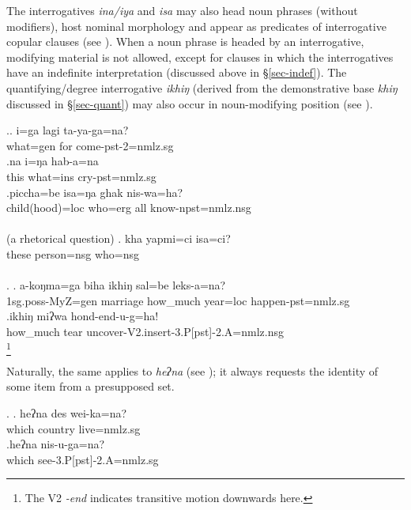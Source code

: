 The interrogatives \emph{ina/iya} and \emph{isa} may also head noun phrases (without modifiers), host nominal morphology and appear as predicates of interrogative copular clauses (see \Next). When a noun phrase is headed by an interrogative, modifying material is not allowed, except for clauses in which the interrogatives have an indefinite interpretation (discussed above in §\ref{sec-indef}).  The quantifying/degree interrogative \emph{ikhiŋ} (derived from the demonstrative base \emph{khiŋ} discussed in §\ref{sec-quant}) may also occur in noun-modifying position (see \NNext).

\ex.\ag. i=ga lagi ta-ya-ga=na?\\
	what{\sc =gen} for come{\sc -pst-2=nmlz.sg}\\
\bg.na   i=ŋa      hab-a=na\\
this what{\sc =ins} cry{\sc [3sg]-pst=nmlz.sg}\\
 
	\bg.piccha=be    isa=ŋa   ghak nis-wa=ha?\\
	child(hood){\sc =loc} who{\sc =erg} all know{\sc [3A;3.P]-npst=nmlz.nsg}\\
	  \\
	(a rhetorical question)
	\bg.	kha yapmi=ci isa=ci?\\
			these  person{\sc =nsg} who{\sc =nsg} \\
			 \\
	
\ex. \ag. a-koŋma=ga      biha     ikhiŋ   sal=be     leks-a=na?\\
{\sc 1sg.poss-}MyZ{\sc =gen}  marriage how\_much year{\sc =loc} happen{\sc [3sg]-pst=nmlz.sg}\\
 
\bg.ikhiŋ   miʔwa hond-end-u-g=ha!\\
how\_much tear uncover{\sc -V2.insert-3.P[pst]-2.A=nmlz.nsg}\\
\footnote{The V2 \emph{-end} indicates transitive motion downwards here.} 

Naturally, the same applies to \emph{heʔna}  (see \Next); it always requests the identity of some item from a presupposed set.

\ex. \ag. heʔna des     wei-ka=na?\\
which country live{=nmlz.sg}\\
 
\bg.heʔna  nis-u-ga=na?\\
which see{\sc -3.P[pst]-2.A=nmlz.sg}\\

